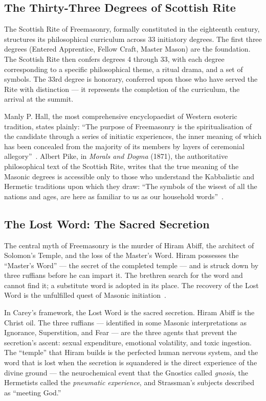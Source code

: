 \documentclass[12pt, a4paper]{article}
\begin{document}
\subsection{The Thirty-Three Degrees of Scottish Rite}

The Scottish Rite of Freemasonry, formally constituted in the eighteenth
century, structures its philosophical curriculum across 33 initiatory degrees.
The first three degrees (Entered Apprentice, Fellow Craft, Master Mason) are
the foundation. The Scottish Rite then confers degrees 4 through 33, with
each degree corresponding to a specific philosophical theme, a ritual drama,
and a set of symbols. The 33rd degree is honorary, conferred upon those who
have served the Rite with distinction — it represents the completion of the
curriculum, the arrival at the summit.

Manly P. Hall, the most comprehensive encyclopaedist of Western esoteric
tradition, states plainly: ``The purpose of Freemasonry is the
spiritualisation of the candidate through a series of initiatic experiences,
the inner meaning of which has been concealed from the majority of its members
by layers of ceremonial allegory''~\autocite[338]{hall1928}. Albert Pike, in
\emph{Morals and Dogma} (1871), the authoritative philosophical text of the
Scottish Rite, writes that the true meaning of the Masonic degrees is
accessible only to those who understand the Kabbalistic and Hermetic traditions
upon which they draw: ``The symbols of the wisest of all the nations and ages,
are here as familiar to us as our household words''~\autocite[625]{pike1871}.

\subsection{The Lost Word: The Sacred Secretion}

The central myth of Freemasonry is the murder of Hiram Abiff, the architect of
Solomon's Temple, and the loss of the Master's Word. Hiram possesses the
``Master's Word'' — the secret of the completed temple — and is struck down
by three ruffians before he can impart it. The brethren search for the word
and cannot find it; a substitute word is adopted in its place. The recovery of
the Lost Word is the unfulfilled quest of Masonic
initiation~\autocite[210]{mackey1874}.

In Carey's framework, the Lost Word is the sacred secretion. Hiram Abiff is
the Christ oil. The three ruffians — identified in some Masonic interpretations
as Ignorance, Superstition, and Fear — are the three agents that prevent the
secretion's ascent: sexual expenditure, emotional volatility, and toxic
ingestion. The ``temple'' that Hiram builds is the perfected human
nervous system, and the word that is lost when the secretion is squandered is
the direct experience of the divine ground — the neurochemical event that the
Gnostics called \emph{gnosis}, the Hermetists called the \emph{pneumatic
experience}, and Strassman's subjects described as ``meeting God.''
\end{document}
